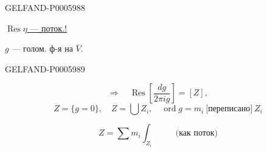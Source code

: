 \begin{GelfandAdjacentEvidence}{GELFAND-P000598}{8}


\underline{\(\operatorname{Res}\eta\) — поток.!}

\(g\) — голом. ф-я на \(\bar V\).
\end{GelfandAdjacentEvidence}
\begin{GelfandAdjacentEvidence}{GELFAND-P000598}{9}

\[
\Rightarrow\quad\operatorname{Res}\left[\frac{dg}{2\pi ig}\right]=[Z],
\]
\[
Z=\{g=0\},\quad Z=\bigcup Z_i,\quad\operatorname{ord}g=m_i\ \text{[переписано]}\ Z_i
\]
\end{GelfandAdjacentEvidence}

\[
Z=\sum m_i\int_{Z_i}\qquad\text{(как поток)}
\]


